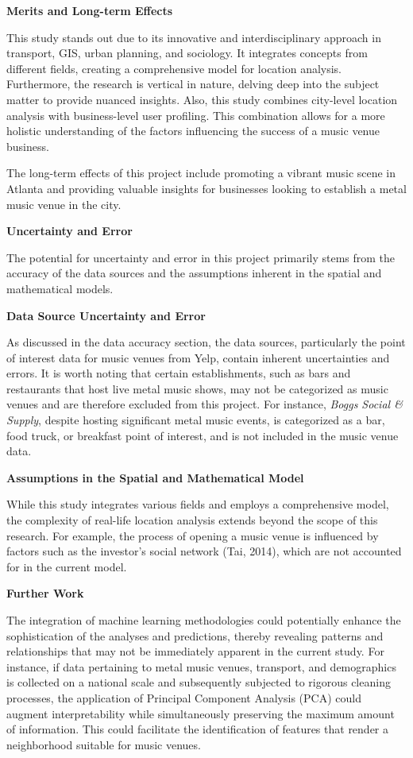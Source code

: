 \documentclass[11pt]{article}
\begin{document}
\textbf{Merits and Long-term Effects}

This study stands out due to its innovative and interdisciplinary approach in transport, GIS, urban planning, and sociology. It integrates concepts from different fields, creating a comprehensive model for location analysis. Furthermore, the research is vertical in nature, delving deep into the subject matter to provide nuanced insights. Also, this study combines city-level location analysis with business-level user profiling. This combination allows for a more holistic understanding of the factors influencing the success of a music venue business.

The long-term effects of this project include promoting a vibrant music scene in Atlanta and providing valuable insights for businesses looking to establish a metal music venue in the city.

\textbf{Uncertainty and Error}

The potential for uncertainty and error in this project primarily stems from the accuracy of the data sources and the assumptions inherent in the spatial and mathematical models.

\textbf{Data Source Uncertainty and Error}

As discussed in the data accuracy section, the data sources, particularly the point of interest data for music venues from Yelp, contain inherent uncertainties and errors. It is worth noting that certain establishments, such as bars and restaurants that host live metal music shows, may not be categorized as music venues and are therefore excluded from this project. For instance, \textit{Boggs Social \& Supply}, despite hosting significant metal music events, is categorized as a bar, food truck, or breakfast point of interest, and is not included in the music venue data.

\textbf{Assumptions in the Spatial and Mathematical Model}

While this study integrates various fields and employs a comprehensive model, the complexity of real-life location analysis extends beyond the scope of this research. For example, the process of opening a music venue is influenced by factors such as the investor’s social network (Tai, 2014), which are not accounted for in the current model.


\textbf{Further Work}

The integration of machine learning methodologies could potentially enhance the sophistication of the analyses and predictions, thereby revealing patterns and relationships that may not be immediately apparent in the current study. For instance, if data pertaining to metal music venues, transport, and demographics is collected on a national scale and subsequently subjected to rigorous cleaning processes, the application of Principal Component Analysis (PCA) could augment interpretability while simultaneously preserving the maximum amount of information. This could facilitate the identification of features that render a neighborhood suitable for music venues.
\end{document}
